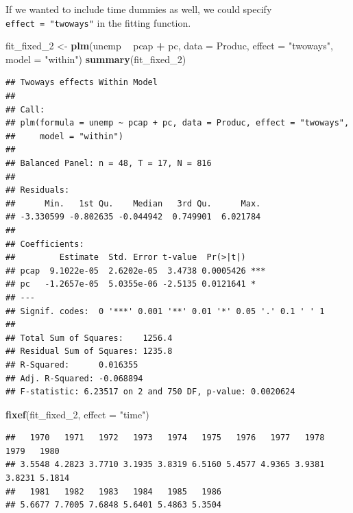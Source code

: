 \documentclass[12pt,oneside,openany]{book}
\newenvironment{Shaded}{\begin{snugshade}}{\end{snugshade}}
\newcommand{\KeywordTok}[1]{\textcolor[rgb]{0.13,0.29,0.53}{\textbf{#1}}}
\newcommand{\DataTypeTok}[1]{\textcolor[rgb]{0.13,0.29,0.53}{#1}}
\newcommand{\DecValTok}[1]{\textcolor[rgb]{0.00,0.00,0.81}{#1}}
\newcommand{\StringTok}[1]{\textcolor[rgb]{0.31,0.60,0.02}{#1}}
\newcommand{\OperatorTok}[1]{\textcolor[rgb]{0.81,0.36,0.00}{\textbf{#1}}}
\newcommand{\NormalTok}[1]{#1}
\begin{document}
If we wanted to include time dummies as well, we could specify
\texttt{effect\ =\ "twoways"} in the fitting function.

\begin{Shaded}
\begin{Highlighting}[]
\NormalTok{fit_fixed_}\DecValTok{2}\NormalTok{ <-}\StringTok{ }\KeywordTok{plm}\NormalTok{(unemp }\OperatorTok{~}\StringTok{ }\NormalTok{pcap }\OperatorTok{+}\StringTok{ }\NormalTok{pc,}
                   \DataTypeTok{data =}\NormalTok{ Produc,}
                   \DataTypeTok{effect =} \StringTok{"twoways"}\NormalTok{,}
                   \DataTypeTok{model =} \StringTok{"within"}\NormalTok{)}
\KeywordTok{summary}\NormalTok{(fit_fixed_}\DecValTok{2}\NormalTok{)}
\end{Highlighting}
\end{Shaded}

\begin{verbatim}
## Twoways effects Within Model
## 
## Call:
## plm(formula = unemp ~ pcap + pc, data = Produc, effect = "twoways", 
##     model = "within")
## 
## Balanced Panel: n = 48, T = 17, N = 816
## 
## Residuals:
##      Min.   1st Qu.    Median   3rd Qu.      Max. 
## -3.330599 -0.802635 -0.044942  0.749901  6.021784 
## 
## Coefficients:
##         Estimate  Std. Error t-value  Pr(>|t|)    
## pcap  9.1022e-05  2.6202e-05  3.4738 0.0005426 ***
## pc   -1.2657e-05  5.0355e-06 -2.5135 0.0121641 *  
## ---
## Signif. codes:  0 '***' 0.001 '**' 0.01 '*' 0.05 '.' 0.1 ' ' 1
## 
## Total Sum of Squares:    1256.4
## Residual Sum of Squares: 1235.8
## R-Squared:      0.016355
## Adj. R-Squared: -0.068894
## F-statistic: 6.23517 on 2 and 750 DF, p-value: 0.0020624
\end{verbatim}

\begin{Shaded}
\begin{Highlighting}[]
\KeywordTok{fixef}\NormalTok{(fit_fixed_}\DecValTok{2}\NormalTok{, }\DataTypeTok{effect =} \StringTok{"time"}\NormalTok{)}
\end{Highlighting}
\end{Shaded}

\begin{verbatim}
##   1970   1971   1972   1973   1974   1975   1976   1977   1978   1979   1980 
## 3.5548 4.2823 3.7710 3.1935 3.8319 6.5160 5.4577 4.9365 3.9381 3.8231 5.1814 
##   1981   1982   1983   1984   1985   1986 
## 5.6677 7.7005 7.6848 5.6401 5.4863 5.3504
\end{verbatim}
\end{document}
